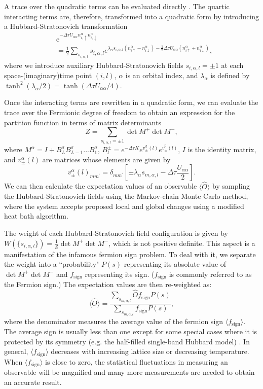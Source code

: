 \documentclass[reprint,nofootinbib,nobibnotes,amsmath,amssymb,aps,prb,floatfix]{revtex4-1}
\newcommand{\beq}{\begin{equation}}
\newcommand{\eeq}{\end{equation}}
\begin{document}
A trace over the quadratic terms can be evaluated directly \cite{BSS}. The quartic interacting terms are, therefore, transformed into a quadratic form by introducing a Hubbard-Stratonovich transformation
\beq\nonumber
\begin{split}
&\text{e}^{-\Delta\tau U_{\alpha\alpha}n^{\alpha}_{i,\uparrow}n^{\alpha}_{i,\downarrow}} \\&= \frac{1}{2}
\sum_{s_{i,\alpha,l}} s_{i,\alpha,l} 
e^{{\lambda_\alpha s_{i,\alpha,l} (n_{i\uparrow}^{\alpha}-n_{i\downarrow}^{\alpha})-\frac{1}{2}\Delta\tau U_{\alpha\alpha} (n^{\alpha}_{i\uparrow}+n^{\alpha}_{i\downarrow})}},
\end{split}
\eeq
where we introduce auxiliary Hubbard-Stratonovich fields $s_{i,\alpha,l}=\pm 1$ at each space-(imaginary)time point $(i,l)$, $\alpha$ is an orbital index, and $\lambda_{\alpha}$ is defined by $\tanh^2(\lambda_\alpha/2)=\tanh(\Delta\tau U_{\alpha\alpha}/4)$.  

Once the interacting terms are rewritten in a quadratic form, we can evaluate the trace over the Fermionic degree of freedom to obtain an expression for the partition function in terms of matrix determinants 
\begin{equation*}
    Z = \sum_{s_{i,\alpha,l}=\pm 1} \det M^{+} \det M^{-}, 
\end{equation*}
where
$M^{\alpha}=I + B^{\sigma}_LB^{\sigma}_{L-1}...B^{\sigma}_{1}$,
$B^{\pm}_l= e^{-\Delta\tau K} e^{v^d_{\pm}(l)}e^{v^p_{\pm}(l)}$, 
$I$ is the identity matrix, 
and $v^\alpha_{\pm}(l)$ are matrices whose elements are given by
\beq\nonumber
v^{\alpha}_{\pm}(l)_{mm^\prime}=\delta_{mm^\prime}\left[\pm \lambda_{\alpha}s_{m,\alpha,l} - \Delta\tau\frac{U_{\alpha\alpha}}{2} \right].
\eeq
We can then calculate the expectation values of an observable $\langle\hat{O}\rangle$ by sampling the Hubbard-Stratonovich fields using the Markov-chain Monte Carlo method, where the system accepts proposed local and global changes using a modified heat bath algorithm.

The weight of each Hubbard-Stratonovich field configuration is given by $W(\{s_{i,\alpha,l}\}) = \tfrac{1}{Z}\det M^{+} \det M^{-}$, which is not positive definite. This aspect is a manifestation of the infamous fermion sign problem. To deal with it, we separate the weight into a ``probability" $P(s)$ representing its absolute value of $\det M^{+} \det M^{-}$ and $f_\mathrm{sign}$ representing its sign. ($f_\mathrm{sign}$ is  commonly referred to as the Fermion sign.) The expectation values are then re-weighted as:
\beq\nonumber
\langle\hat{O}\rangle =\frac{\sum_{s_{m,\alpha,l}} \hat{O} f_\mathrm{sign} P(s)}{\sum_{s_{m,\alpha,l}} f_\mathrm{sign} P(s)},
\eeq
where the denominator measures the average value of the fermion sign $\langle f_\mathrm{sign}\rangle$. The average sign is usually less than one except for some special cases where it is protected by its symmetry (e.g. the half-filled single-band Hubbard model) \cite{Iglovikov2015}. In general, $\langle f_\mathrm{sign}\rangle$ decreases with increasing lattice size or decreasing temperature. When $\langle f_\mathrm{sign}\rangle$ is close to zero, the statistical fluctuations in measuring an observable will be magnified and many more measurements are needed to obtain an accurate result.
\end{document}

